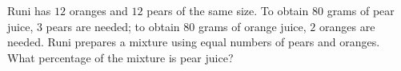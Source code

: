 Runi has $12$ oranges and $12$ pears of the same size. To obtain $80$ grams of pear juice, $3$ pears are needed; to obtain $80$ grams of orange juice, $2$ oranges are needed. Runi prepares a mixture using equal numbers of pears and oranges. What percentage of the mixture is pear juice?
